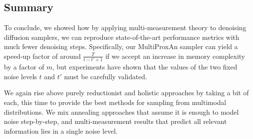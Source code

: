 \subsection{Summary}

To conclude, we showed how by applying multi-measurement theory to denoising diffusion samplers, we can reproduce state-of-the-art performance metrics with much fewer denoising steps. Specifically, our MultiProxAn sampler can yield a speed-up factor of around $\frac{T}{t-t'+1}$ if we accept an increase in memory complexity by a factor of $m$, but experiments have shown that the values of the two fixed noise levels $t$ and $t'$ must be carefully validated. 

We again rise above purely reductionist and holistic approaches by taking a bit of each, this time to provide the best methods for sampling from multimodal distributions. We mix annealing approaches that assume it is enough to model noise step-by-step, and multi-measurement results that predict all relevant information lies in a single noise level. 